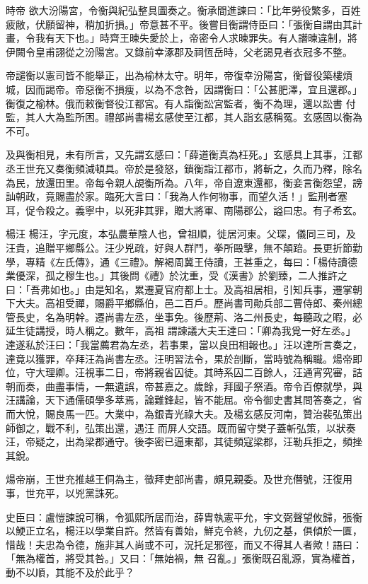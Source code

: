 \begin{pinyinscope}
 時帝
 欲大汾陽宮，令衡與紀弘整具圖奏之。衡承間進諫曰：「比年勞役繁多，百姓疲敝，伏願留神，稍加折損。」帝意甚不平。後嘗目衡謂侍臣曰：「張衡自謂由其計畫，令我有天下也。」時齊王暕失愛於上，帝密令人求暕罪失。有人譖暕違制，將伊闕令皇甫詡從之汾陽宮。又錄前幸涿郡及祠恆岳時，父老謁見者衣冠多不整。



 帝譴衡以憲司皆不能舉正，出為榆林太守。明年，帝復幸汾陽宮，衡督役築樓煩城，因而謁帝。帝惡衡不損瘦，以為不念咎，因謂衡曰：「公甚肥澤，宜且還郡。」衡復之榆林。俄而敕衡督役江都宮。有人詣衡訟宮監者，衡不為理，還以訟書
 付監，其人大為監所困。禮部尚書楊玄感使至江都，其人詣玄感稱冤。玄感固以衡為不可。



 及與衡相見，未有所言，又先謂玄感曰：「薛道衡真為枉死。」玄感具上其事，江都丞王世充又奏衡頻減頓具。帝於是發怒，鎖衡詣江都市，將斬之，久而乃釋，除名為民，放還田里。帝每令親人覘衡所為。八年，帝自遼東還都，衡妾言衡怨望，謗訕朝政，竟賜盡於家。臨死大言曰：「我為人作何物事，而望久活！」監刑者塞耳，促令殺之。義寧中，以死非其罪，贈大將軍、南陽郡公，謚曰忠。有子希玄。



 楊汪
 楊汪，字元度，本弘農華陰人也，曾祖順，徙居河東。父琛，儀同三司，及汪貴，追贈平鄉縣公。汪少兇疏，好與人群鬥，拳所毆擊，無不顛踣。長更折節勤學，專精《左氏傳》，通《三禮》。解褐周冀王侍讀，王甚重之，每曰：「楊侍讀德業優深，孤之穆生也。」其後問《禮》於沈重，受《漢書》於劉臻，二人推許之曰：「吾弗如也。」由是知名，累遷夏官府都上士。及高祖居相，引知兵事，遷掌朝下大夫。高祖受禪，賜爵平鄉縣伯，邑二百戶。歷尚書司勛兵部二曹侍郎、秦州總管長史，名為明幹。遷尚書左丞，坐事免。後歷荊、洛二州長史，每聽政之暇，必延生徒講授，時人稱之。數年，高祖
 謂諫議大夫王達曰：「卿為我覓一好左丞。」達遂私於汪曰：「我當薦君為左丞，若事果，當以良田相報也。」汪以達所言奏之，達竟以獲罪，卒拜汪為尚書左丞。汪明習法令，果於剖斷，當時號為稱職。煬帝即位，守大理卿。汪視事二日，帝將親省囚徒。其時系囚二百餘人，汪通宵究審，詰朝而奏，曲盡事情，一無遺誤，帝甚嘉之。歲餘，拜國子祭酒。帝令百僚就學，與汪講論，天下通儒碩學多萃焉，論難鋒起，皆不能屈。帝令御史書其問答奏之，省而大悅，賜良馬一匹。大業中，為銀青光祿大夫。及楊玄感反河南，贊治裴弘策出師御之，戰不利，弘策出還，遇汪
 而屏人交語。既而留守樊子蓋斬弘策，以狀奏汪，帝疑之，出為梁郡通守。後李密已逼東都，其徒頻寇梁郡，汪勒兵拒之，頻挫其銳。



 煬帝崩，王世充推越王侗為主，徵拜吏部尚書，頗見親委。及世充僭號，汪復用事，世充平，以兇黨誅死。



 史臣曰：盧愷諫說可稱，令狐熙所居而治，薛胄執憲平允，宇文弼聲望攸歸，張衡以鯁正立名，楊汪以學業自許。然皆有善始，鮮克令終，九仞之基，俱傾於一匱，惜哉！夫忠為令德，施非其人尚或不可，況托足邪徑，而又不得其人者歟！語曰：「無為權首，將受其咎。」又曰：「無始禍，無
 召亂。」張衡既召亂源，實為權首，動不以順，其能不及於此乎？



\end{pinyinscope}
